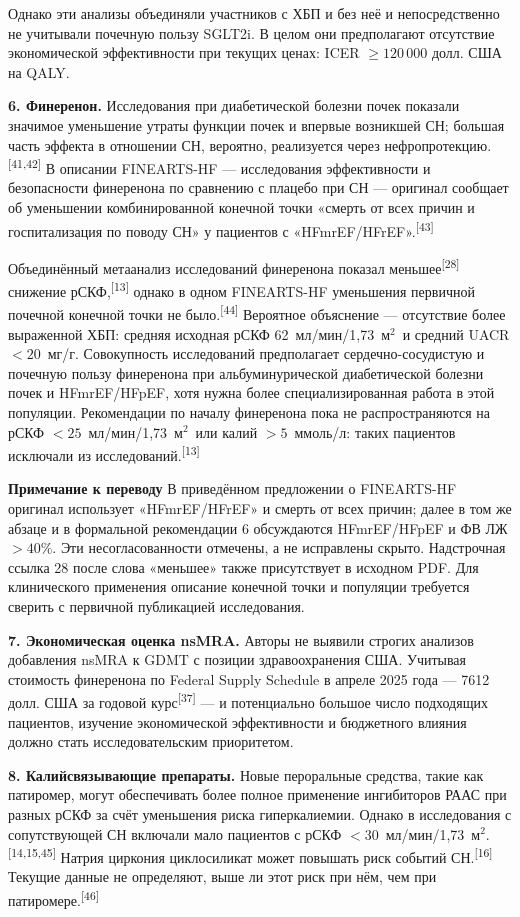 \documentclass[11pt,a4paper]{article}
\newcommand{\src}[1]{\textsuperscript{[#1]}}
\newcommand{\editorial}[1]{\par\begingroup\small\color{black!70}\textbf{Примечание к переводу} #1\par\endgroup}
\newcommand{\unitgfr}{мл/мин/1,73~м$^2$}
\begin{document}
Однако эти анализы объединяли участников с ХБП и без неё и непосредственно не учитывали почечную пользу SGLT2i. В целом они предполагают отсутствие экономической эффективности при текущих ценах: ICER $\geq120\,000$ долл. США на QALY.

\textbf{6. Финеренон.} Исследования при диабетической болезни почек показали значимое уменьшение утраты функции почек и впервые возникшей СН; большая часть эффекта в отношении СН, вероятно, реализуется через нефропротекцию.\src{41,42} В описании FINEARTS-HF --- исследования эффективности и безопасности финеренона по сравнению с плацебо при СН --- оригинал сообщает об уменьшении комбинированной конечной точки «смерть от всех причин и госпитализация по поводу СН» у пациентов с «HFmrEF/HFrEF».\src{43}

Объединённый метаанализ исследований финеренона показал меньшее\src{28} снижение рСКФ,\src{13} однако в одном FINEARTS-HF уменьшения первичной почечной конечной точки не было.\src{44} Вероятное объяснение --- отсутствие более выраженной ХБП: средняя исходная рСКФ 62~\unitgfr\ и средний UACR $<20$~мг/г. Совокупность исследований предполагает сердечно-сосудистую и почечную пользу финеренона при альбуминурической диабетической болезни почек и HFmrEF/HFpEF, хотя нужна более специализированная работа в этой популяции. Рекомендации по началу финеренона пока не распространяются на рСКФ $<25$~\unitgfr\ или калий $>5$~ммоль/л: таких пациентов исключали из исследований.\src{13}
\editorial{В приведённом предложении о FINEARTS-HF оригинал использует «HFmrEF/HFrEF» и смерть от всех причин; далее в том же абзаце и в формальной рекомендации 6 обсуждаются HFmrEF/HFpEF и ФВ ЛЖ $>40\%$. Эти несогласованности отмечены, а не исправлены скрыто. Надстрочная ссылка 28 после слова «меньшее» также присутствует в исходном PDF. Для клинического применения описание конечной точки и популяции требуется сверить с первичной публикацией исследования.}

\textbf{7. Экономическая оценка nsMRA.} Авторы не выявили строгих анализов добавления nsMRA к GDMT с позиции здравоохранения США. Учитывая стоимость финеренона по Federal Supply Schedule в апреле 2025 года --- 7612 долл. США за годовой курс\src{37} --- и потенциально большое число подходящих пациентов, изучение экономической эффективности и бюджетного влияния должно стать исследовательским приоритетом.

\textbf{8. Калийсвязывающие препараты.} Новые пероральные средства, такие как патиромер, могут обеспечивать более полное применение ингибиторов РААС при разных рСКФ за счёт уменьшения риска гиперкалиемии. Однако в исследования с сопутствующей СН включали мало пациентов с рСКФ $<30$~\unitgfr.\src{14,15,45} Натрия циркония циклосиликат может повышать риск событий СН.\src{16} Текущие данные не определяют, выше ли этот риск при нём, чем при патиромере.\src{46}
\end{document}
